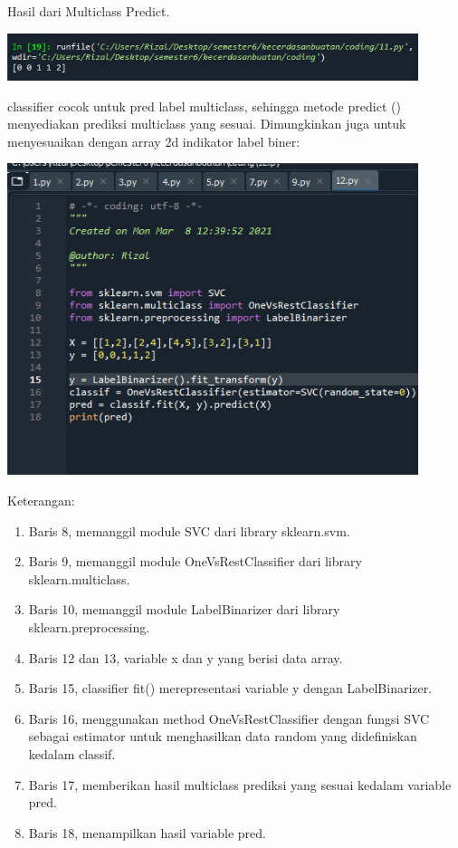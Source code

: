 \documentclass{article}
\begin{document}
Hasil dari Multiclass Predict.
    \begin{center}
    \includegraphics[width=12cm]{figures/1184033/chapter1/26.PNG}
    \end{center}


classifier cocok untuk pred label multiclass, sehingga metode predict () menyediakan prediksi multiclass yang sesuai. Dimungkinkan juga untuk menyesuaikan dengan array 2d indikator label biner:

    \begin{center}
    \includegraphics[width=12cm]{figures/1184033/chapter1/27.PNG}
    \end{center}
Keterangan:
    \begin{enumerate}
        \item Baris 8, memanggil module SVC dari library sklearn.svm.
        \item Baris 9, memanggil module OneVsRestClassifier dari library sklearn.multiclass.
        \item Baris 10, memanggil module LabelBinarizer dari library sklearn.preprocessing.
        \item Baris 12 dan 13, variable x dan y yang berisi data array.
        \item Baris 15, classifier fit() merepresentasi variable y dengan LabelBinarizer.
        \item Baris 16, menggunakan method OneVsRestClassifier dengan fungsi SVC sebagai estimator untuk menghasilkan data random yang didefiniskan kedalam classif.
        \item Baris 17, memberikan hasil multiclass prediksi yang sesuai kedalam variable pred.
        \item Baris 18, menampilkan hasil variable pred. 
    \end{enumerate}
\end{document}
